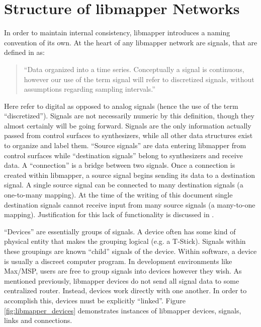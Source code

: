 	\section{Structure of libmapper Networks} %
	\label{sec:structure_of_libmapper_networks}

In order to maintain internal consistency, libmapper introduces a naming convention of its own. At the heart of any libmapper network are signals, that are defined in  as:
\begin{quote}
``Data organized into a time series. Conceptually a signal is continuous, however our use of the term signal will refer to discretized signals, without assumptions regarding sampling intervals.''
\end{quote}
Here  refer to digital as opposed to analog signals (hence the use of the term ``discretized''). Signals are not necessarily numeric by this definition, though they almost certainly will be going forward. Signals are the only information actually passed from control surfaces to synthesizers, while all other data structures exist to organize and label them. ``Source signals'' are data entering libmapper from control surfaces while ``destination signals'' belong to synthesizers and receive data. A ``connection'' is a bridge between two signals. Once a connection is created within libmapper, a source signal begins sending its data to a destination signal. A single source signal can be connected to many destination signals (a one-to-many mapping). At the time of the writing of this document single destination signals cannot receive input from many source signals (a many-to-one mapping). Justification for this lack of functionality is discussed in .

``Devices'' are essentially groups of signals. A device often has some kind of physical entity that makes the grouping logical (e.g. a T-Stick). Signals within these groupings are known ``child'' signals of the device. Within software, a device is usually a discreet computer program. In development environments like Max/MSP, users are free to group signals into devices however they wish. As mentioned previously, libmapper devices do not send all signal data to some centralized router. Instead, devices work directly with one another. In order to accomplish this, devices must be explicitly ``linked''. Figure \ref{fig:libmapper_devices} demonstrates instances of libmapper devices, signals, links and connections.
 
